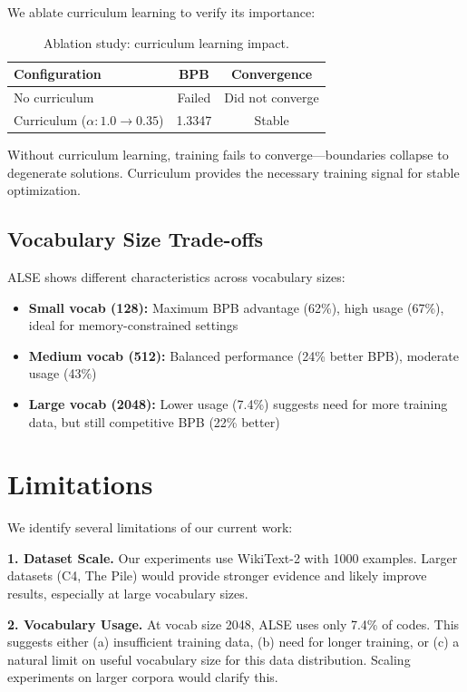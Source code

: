 \documentclass{article}
\begin{document}
We ablate curriculum learning to verify its importance:

\begin{table}[h]
\centering
\caption{Ablation study: curriculum learning impact.}
\label{tab:ablation_curriculum}
\begin{tabular}{lcc}
\toprule
Configuration & BPB & Convergence \\
\midrule
No curriculum & Failed & Did not converge \\
Curriculum ($\alpha: 1.0 \rightarrow 0.35$) & 1.3347 & Stable \\
\bottomrule
\end{tabular}
\end{table}

Without curriculum learning, training fails to converge—boundaries collapse to degenerate solutions. Curriculum provides the necessary training signal for stable optimization.

\subsection{Vocabulary Size Trade-offs}

ALSE shows different characteristics across vocabulary sizes:

\begin{itemize}
    \item \textbf{Small vocab (128):} Maximum BPB advantage (62\%), high usage (67\%), ideal for memory-constrained settings
    \item \textbf{Medium vocab (512):} Balanced performance (24\% better BPB), moderate usage (43\%)
    \item \textbf{Large vocab (2048):} Lower usage (7.4\%) suggests need for more training data, but still competitive BPB (22\% better)
\end{itemize}

\section{Limitations}

We identify several limitations of our current work:

\textbf{1. Dataset Scale.} Our experiments use WikiText-2 with 1000 examples. Larger datasets (C4, The Pile) would provide stronger evidence and likely improve results, especially at large vocabulary sizes.

\textbf{2. Vocabulary Usage.} At vocab size 2048, ALSE uses only 7.4\% of codes. This suggests either (a) insufficient training data, (b) need for longer training, or (c) a natural limit on useful vocabulary size for this data distribution. Scaling experiments on larger corpora would clarify this.
\end{document}
